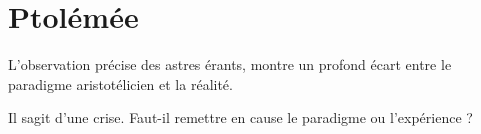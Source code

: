 

\section{Ptolémée}

L'observation précise des astres érants, montre un profond écart entre le paradigme aristotélicien et la réalité.

Il sagit d'une crise. Faut-il remettre en cause le paradigme ou l'expérience ?








